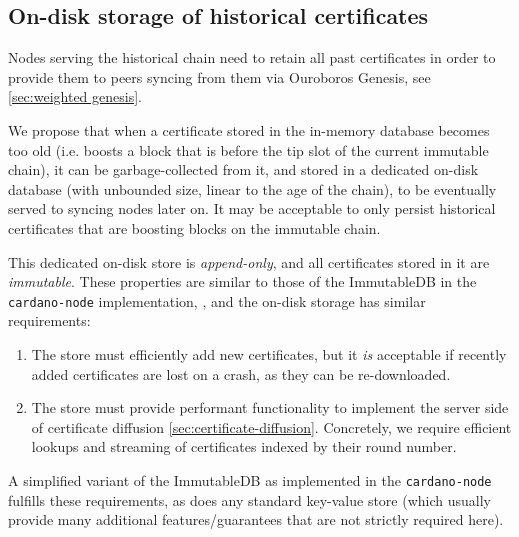 \subsection{On-disk storage of historical certificates}

Nodes serving the historical chain need to retain all past certificates in order to provide them to peers syncing from them via Ouroboros Genesis, see \cref{sec:weighted genesis}.

We propose that when a certificate stored in the in-memory database becomes too old (i.e. boosts a block that is before the tip slot of the current immutable chain), it can be garbage-collected from it, and stored in a dedicated on-disk database (with unbounded size, linear to the age of the chain), to be eventually served to syncing nodes later on. It may be acceptable to only persist historical certificates that are boosting blocks on the immutable chain.

This dedicated on-disk store is \emph{append-only}, and all certificates stored in it are \emph{immutable}. These properties are similar to those of the ImmutableDB in the \texttt{cardano-node} implementation, \parencite[chapter~8]{consensus-storage-report}, and the on-disk storage has similar requirements:
\begin{enumerate}
\item
  The store must efficiently add new certificates, but it \emph{is} acceptable if recently added certificates are lost on a crash, as they can be re-downloaded.
\item
  The store must provide performant functionality to implement the server side of certificate diffusion \cref{sec:certificate-diffusion}.
  Concretely, we require efficient lookups and streaming of certificates indexed by their round number.
\end{enumerate}
A simplified variant of the ImmutableDB as implemented in the \texttt{cardano-node} fulfills these requirements, as does any standard key-value store (which usually provide many additional features/guarantees that are not strictly required here).


